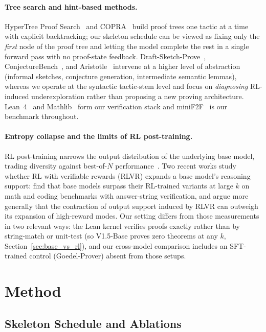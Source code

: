 \documentclass{article}
\begin{document}
\paragraph{Tree search and hint-based methods.}
HyperTree Proof Search~\cite{lample2022hypertree} and COPRA~\cite{thakur2023copra} build proof trees one tactic at a time with explicit backtracking; our skeleton schedule can be viewed as fixing only the \emph{first} node of the proof tree and letting the model complete the rest in a single forward pass with no proof-state feedback. Draft-Sketch-Prove~\cite{jiang2023dsp}, ConjectureBench~\cite{sivakumar2025conjecturing}, and Aristotle~\cite{achim2025aristotle} intervene at a higher level of abstraction (informal sketches, conjecture generation, intermediate semantic lemmas), whereas we operate at the syntactic tactic-stem level and focus on \emph{diagnosing} RL-induced underexploration rather than proposing a new proving architecture. Lean~4~\cite{demoura2021lean4} and Mathlib~\cite{mathlib} form our verification stack and miniF2F~\cite{zheng2022minif2f} is our benchmark throughout.

\paragraph{Entropy collapse and the limits of RL post-training.}
RL post-training narrows the output distribution of the underlying base model, trading diversity against best-of-$N$ performance~\cite{kirk2024understanding}. Two recent works study whether RL with verifiable rewards (RLVR) expands a base model's reasoning support: \citet{yue2025rlvr} find that base models surpass their RL-trained variants at large $k$ on math and coding benchmarks with answer-string verification, and \citet{wu2025invisibleleash} argue more generally that the contraction of output support induced by RLVR can outweigh its expansion of high-reward modes. Our setting differs from those measurements in two relevant ways: the Lean kernel verifies proofs exactly rather than by string-match or unit-test (so V1.5-Base proves zero theorems at any $k$, Section~\ref{sec:base_vs_rl}), and our cross-model comparison includes an SFT-trained control (Goedel-Prover) absent from those setups.


\section{Method}

\subsection{Skeleton Schedule and Ablations}
\label{sec:methods_schedule}
\end{document}

